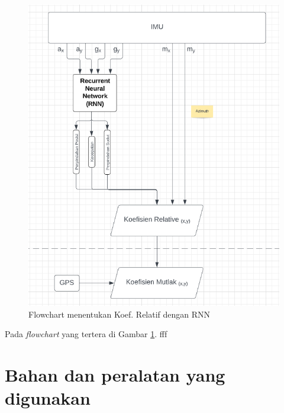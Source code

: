 \begin{figure} [ht] \centering
  \includegraphics[scale=0.55]{gambar/IMU-to-KRel-KMut.png}
  \caption{Flowchart menentukan Koef. Relatif dengan RNN}
  \label{fig:Koef-Relatif}
\end{figure}


Pada \emph{flowchart} yang tertera di Gambar \ref{fig:Koef-Relatif}.  fff

\section{Bahan dan peralatan yang digunakan}

